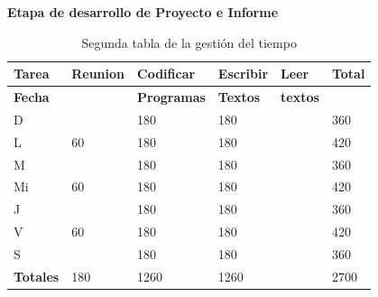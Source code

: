 \documentclass[a4paper,12pt,openany,oneside]{book}
\begin{document}
\begin{table}
\textbf{Etapa de desarrollo de Proyecto e Informe}\\
\begin{tabular}{| l | l | l | l | l | l |}
\hline
\textbf{Tarea} & \textbf{Reunion} & \textbf{Codificar} & \textbf{Escribir} & \textbf{Leer} & \textbf{Total} \\
\hline
\textbf{Fecha} &                  & \textbf{Programas} & \textbf{Textos} & \textbf{textos} & \\
\hline
D  &    & 180 & 180 &  & 360 \\
\hline
L  & 60 & 180 & 180 &  & 420 \\
\hline
M  &    & 180 & 180 &  & 360 \\
\hline
Mi & 60 & 180 & 180 &  & 420 \\
\hline
J  &    & 180 & 180 &  & 360 \\
\hline
V  & 60 & 180 & 180 &  & 420 \\
\hline
S  &    & 180 & 180 &  & 360 \\
\hline
\textbf{Totales} & 180 & 1260 & 1260 &  & 2700 \\
\hline
\end{tabular}
\caption{Segunda tabla de la gestión del tiempo}
\end{table}
\end{document}
